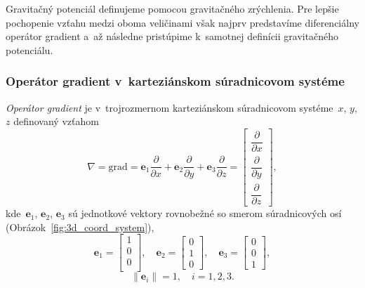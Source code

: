 \documentclass[a4paper, 12pt]{book}
\newcommand{\grad}{\mathrm{grad}}
\let\vec\mathbf
\begin{document}
Gravitačný potenciál definujeme pomocou gravitačného zrýchlenia.  Pre lepšie 
pochopenie vzťahu medzi oboma veličinami však najprv predstavíme diferenciálny 
operátor gradient a~až následne pristúpime k~samotnej definícii gravitačného 
potenciálu.

\subsubsection{Operátor gradient v~karteziánskom súradnicovom systéme}
\label{sec:gradient}

\emph{Operátor gradient} je v~trojrozmernom karteziánskom súradnicovom 
systéme~$x$, $y$, $z$ definovaný vzťahom
%
\begin{equation}
\label{eq:gradient}
\nabla = \grad = \vec e_1 \frac{\partial}{\partial x} + \vec e_2
\frac{\partial}{\partial y} + \vec e_3 \frac{\partial}{\partial z} =
\begin{bmatrix}
\dfrac{\partial}{\partial x} \\[2ex]
\dfrac{\partial}{\partial y} \\[2ex]
\dfrac{\partial}{\partial z}
\end{bmatrix}
{,}
\end{equation}
%
kde~$\vec e_1$, $\vec e_2$, $\vec e_3$ sú jednotkové vektory
rovnobežné so smerom súradnicových osí (Obrázok~\ref{fig:3d_coord_system}),
%
\begin{equation}
\label{eq:unit_vectors}
\vec e_1 =
\begin{bmatrix}
1\\
0\\
0\\
\end{bmatrix}
{,} \quad
%
\vec e_2 =
\begin{bmatrix}
0\\
1\\
0
\end{bmatrix}
%
{,}\quad
%
\vec e_3 =
\begin{bmatrix}
0\\
0\\
1
\end{bmatrix}
{,}
\end{equation}
%
\begin{equation}
\label{eq:unit_vectors_unit_length}
\| \vec e_i \| = 1{,} \quad i = 1, 2,3{.}
\end{equation}
\end{document}
